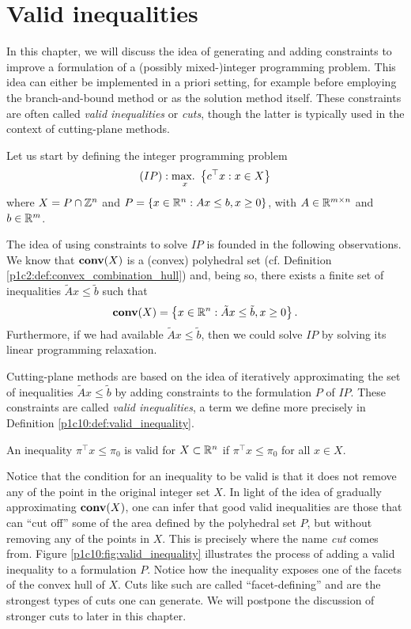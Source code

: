 \section{Valid inequalities}

In this chapter, we will discuss the idea of generating and adding constraints to improve a formulation of a (possibly mixed-)integer programming problem. This idea can either be implemented in a priori setting, for example before employing the branch-and-bound method or as the solution method itself. These constraints are often called \emph{valid inequalities} or \emph{cuts}, though the latter is typically used in the context of cutting-plane methods.

Let us start by defining the integer programming problem
%
\begin{equation*}
	(IP) : \mathop{\text{max.~}}_x \left\{ c^\top x : x \in X \right \}
\end{equation*}
%
where $X = P \cap \mathbb{Z}^n$ and $P = \left\{ x \in \mathbb{R}^n : Ax \leq b, x \geq 0 \right \}$, with $A \in \mathbb{R}^{m \times n}$ and $b \in \mathbb{R}^m$. 

The idea of using constraints to solve $IP$ is founded in the following observations. We know that $\mathop{\bf conv}(X)$ is a (convex) polyhedral set (cf. Definition \ref{p1c2:def:convex_combination_hull}) and, being so, there exists a finite set of inequalities $\tilde{A}x \le \tilde{b}$ such that 
%
\begin{equation*}
	\mathop{\bf conv}(X) = \left\{ x \in \mathbb{R}^n: \tilde{A}x \leq \tilde{b}, x \geq 0 \right \}.	
\end{equation*}
%
Furthermore, if we had available $\tilde{A}x \le \tilde{b}$, then we could solve $IP$ by solving its linear programming relaxation.

Cutting-plane methods are based on the idea of iteratively approximating the set of inequalities $\tilde{A}x \le \tilde{b}$ by adding constraints to the formulation $P$ of $IP$. These constraints are called \emph{valid inequalities}, a term we define more precisely in Definition \ref{p1c10:def:valid_inequality}.

\begin{definition} \label{p1c10:def:valid_inequality}
	An inequality $\pi^\top  x \leq \pi_0$ is valid for $X \subset \mathbb{R}^n$ if $\pi^\top  x \leq \pi_0$ for all $x \in X$.
\end{definition}

Notice that the condition for an inequality to be valid is that it does not remove any of the point in the original integer set $X$. In light of the idea of gradually approximating $\mathop{\bf conv}(X)$, one can infer that good valid inequalities are those that can ``cut off'' some of the area defined by the polyhedral set $P$, but without removing any of the points in $X$. This is precisely where the name \emph{cut} comes from. Figure \ref{p1c10:fig:valid_inequality} illustrates the process of adding a valid inequality to a formulation $P$. Notice how the inequality exposes one of the facets of the convex hull of $X$. Cuts like such are called ``facet-defining'' and are the strongest types of cuts one can generate. We will postpone the discussion of stronger cuts to later in this chapter.

